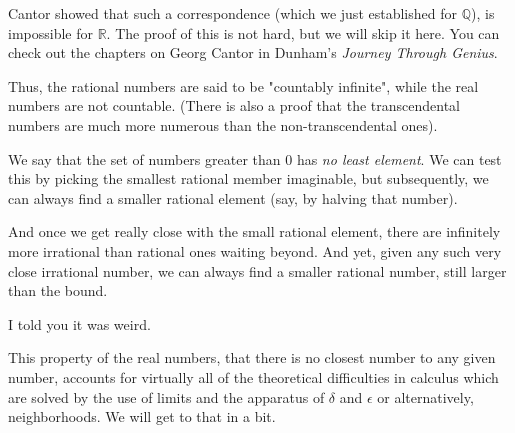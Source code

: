 \documentclass[11pt, oneside]{article}
\begin{document}
Cantor showed that such a correspondence (which we just established for $\mathbb{Q}$), is impossible for $\mathbb{R}$.  The proof of this is not hard, but we will skip it here.  You can check out the chapters on Georg Cantor in Dunham's \emph{Journey Through Genius}.

Thus, the rational numbers are said to be "countably infinite", while the real numbers are not countable.  (There is also a proof that the transcendental numbers are much more numerous than the non-transcendental ones).

We say that the set of numbers greater than $0$ has \emph{no least element}.  We can test this by picking the smallest rational member imaginable, but subsequently, we can always find a smaller rational element (say, by halving that number).  

And once we get really close with the small rational element, there are infinitely more irrational than rational ones waiting beyond.  And yet, given any such very close irrational number, we can always find a smaller rational number, still larger than the bound.

I told you it was weird.

This property of the real numbers, that there is no closest number to any given number, accounts for virtually all of the theoretical difficulties in calculus which are solved by the use of limits and the apparatus of $\delta$ and $\epsilon$ or alternatively, neighborhoods.  We will get to that in a bit.
\end{document}
